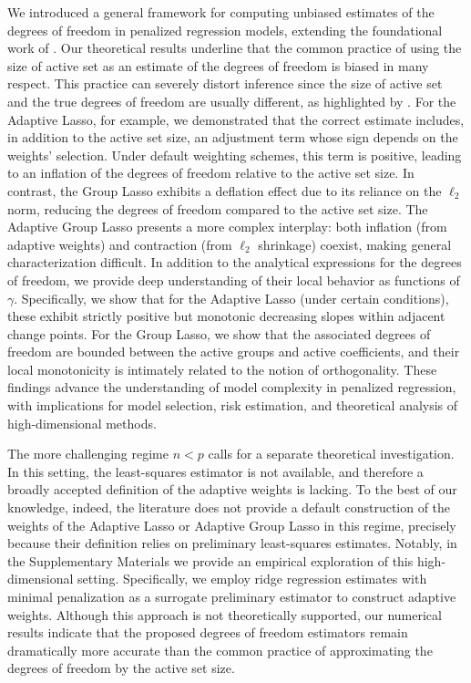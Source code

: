 \documentclass[a4paper, 12pt]{article}
\begin{document}
We introduced a general framework for computing unbiased estimates of the degrees of freedom in penalized regression models, extending the foundational work of \cite{zou2007}. Our theoretical results underline that the common practice of using the size of active set as an estimate of the degrees of freedom is biased in many respect. This practice can severely distort inference since the size of active set and the true degrees of freedom are usually different, as highlighted by \cite{janson_etal.2015}. 
%
For the Adaptive Lasso, for example, we demonstrated that the correct estimate includes, in addition to the active set size, an adjustment term whose sign depends on the weights' selection. Under default weighting schemes, this term is positive, leading to an inflation of the degrees of freedom relative to the active set size.
In contrast, the Group Lasso exhibits a deflation effect due to its reliance on the $\ell_2$ norm, reducing the degrees of freedom compared to the active set size. The Adaptive Group Lasso presents a more complex interplay: both inflation (from adaptive weights) and contraction (from $\ell_2$ shrinkage) coexist, making general characterization difficult. In addition to the analytical expressions for the degrees of freedom,  we provide deep understanding of their local behavior as functions of $\gamma$. Specifically, we show that for the Adaptive Lasso (under certain conditions), these exhibit strictly positive but monotonic decreasing slopes within adjacent change points. For the Group Lasso, we show that the associated degrees of freedom are bounded between the active groups and active coefficients, and their local monotonicity is intimately related to the notion of orthogonality. 
These findings advance the understanding of model complexity in penalized regression, with implications for model selection, risk estimation, and theoretical analysis of high-dimensional methods. \par
%
The more challenging regime $n<p$ calls for a separate theoretical investigation. In this setting, the least-squares estimator is not available, and therefore a broadly accepted definition of the adaptive weights is lacking. To the best of our knowledge, indeed, the literature does not provide a default construction of the weights of the Adaptive Lasso or Adaptive Group Lasso in this regime, precisely because their definition relies on preliminary least-squares estimates. Notably, in the Supplementary Materials we provide an empirical exploration of this high-dimensional setting. Specifically, we employ ridge regression estimates with minimal penalization as a surrogate preliminary estimator to construct adaptive weights. Although this approach is not theoretically supported, our numerical results indicate that the proposed degrees of freedom estimators remain dramatically more accurate than the common practice of approximating the degrees of freedom by the active set size.
\end{document}
